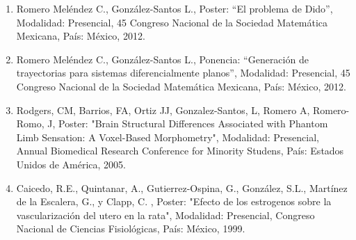 \begin{enumerate}
\item Romero Meléndez C., González-Santos L., Poster: “El problema de Dido”, Modalidad: Presencial, 45 Congreso Nacional de la 
Sociedad Matemática Mexicana, País: México, 2012.

\item Romero Meléndez C., González-Santos L., Ponencia: “Generación de trayectorias para sistemas diferencialmente planos”, 
Modalidad: Presencial, 45 Congreso Nacional de la Sociedad Matemática Mexicana, País: México, 2012.

\item Rodgers, CM, Barrios, FA, Ortiz JJ, Gonzalez-Santos, L, Romero A, Romero-Romo, J, Poster: "Brain Structural Differences 
Associated with Phantom Limb Sensation: A Voxel-Based Morphometry", Modalidad: Presencial, Annual Biomedical Research 
Conference for Minority Studens, País: Estados Unidos de América, 2005.

\item Caicedo, R.E., Quintanar, A., Gutierrez-Ospina, G., González, S.L., Martínez de la Escalera, G., y Clapp, C. , Poster: 
"Efecto de los estrogenos sobre la vascularización del utero en la rata", Modalidad: Presencial, Congreso Nacional de 
Ciencias Fisiológicas, País: México, 1999.

\end{enumerate}


